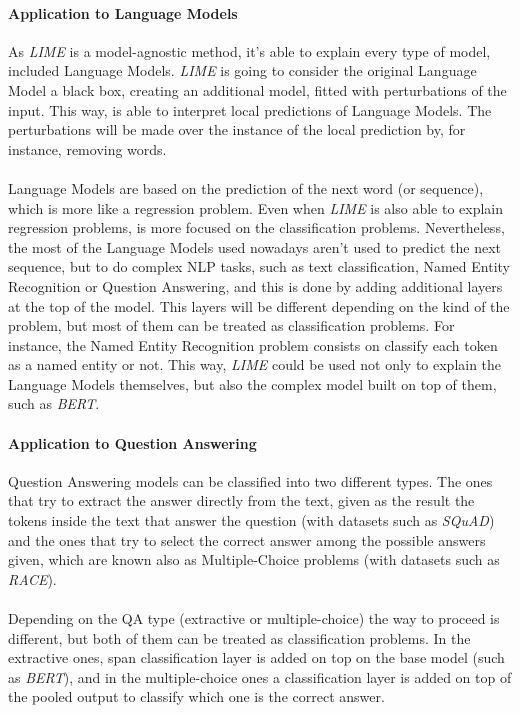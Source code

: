 \paragraph{Application to Language Models}
As \emph{LIME} is a model-agnostic method, it's able to explain every type of model, included Language Models. \emph{LIME} is going to consider the original Language Model a black box, creating an additional model, fitted with perturbations of the input. This way, is able to interpret local predictions of Language Models. The perturbations will be made over the instance of the local prediction by, for instance, removing words. 
\paragraph{}
Language Models are based on the prediction of the next word (or sequence), which is more like a regression problem. Even when \emph{LIME} is also able to explain regression problems, is more focused on the classification problems. Nevertheless, the most of the Language Models used nowadays aren't used to predict the next sequence, but to do complex NLP tasks, such as text classification, Named Entity Recognition or Question Answering, and this is done by adding additional layers at the top of the model. This layers will be different depending on the kind of the problem, but most of them can be treated as classification problems. For instance, the Named Entity Recognition problem consists on classify each token as a named entity or not.  This way, \emph{LIME} could be used not only to explain the Language Models themselves, but also the complex model built on top of them, such as \emph{BERT}.

\paragraph{Application to Question Answering}
Question Answering models can be classified into two different types. The ones that try to extract the answer directly from the text, given as the result the tokens inside the text that answer the question (with datasets such as \emph{SQuAD}) and the ones that try to select the correct answer among the possible answers given, which are known also as Multiple-Choice problems (with datasets such as \emph{RACE}).
\paragraph{} 
Depending on the QA type (extractive or multiple-choice) the way to proceed is different, but both of them can be treated as classification problems. In the extractive ones, span classification layer is added on top on the base model (such as \emph{BERT}), and in the multiple-choice ones  a classification layer is added on top of the pooled output to classify which one is the correct answer.
